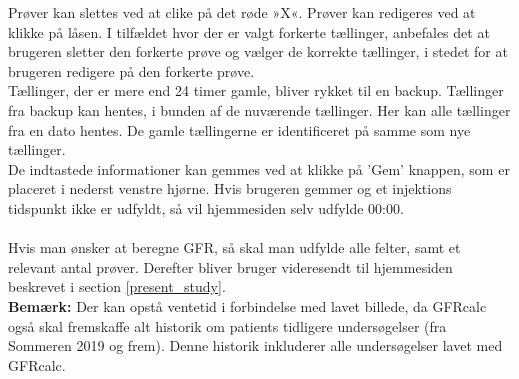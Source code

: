 \documentclass{article}
\begin{document}
Prøver kan slettes ved at clike på det røde »X«. Prøver kan redigeres ved at klikke på låsen. I tilfældet hvor der er valgt forkerte tællinger, anbefales det at brugeren sletter den forkerte prøve og vælger de korrekte tællinger, i stedet for at brugeren redigere på den forkerte prøve.\\

Tællinger, der er mere end 24 timer gamle, bliver rykket til en backup. Tællinger fra backup kan hentes, i bunden af de nuværende tællinger. Her kan alle tællinger fra en dato hentes. De gamle tællingerne er identificeret på samme som nye tællinger.
\\

De indtastede informationer kan gemmes ved at klikke på 'Gem' knappen, som er placeret i nederst venstre hjørne. Hvis brugeren gemmer og et injektions tidspunkt ikke er udfyldt, så vil hjemmesiden selv udfylde 00:00.\\\\
Hvis man ønsker at beregne GFR, så skal man udfylde alle felter, samt et relevant antal prøver. Derefter bliver bruger videresendt til hjemmesiden beskrevet i section \ref{present_study}.\\

\textbf{Bemærk:} Der kan opstå ventetid i forbindelse med lavet billede, da GFRcalc også skal fremskaffe alt historik om patients tidligere undersøgelser (fra Sommeren 2019 og frem). Denne historik inkluderer alle undersøgelser lavet med GFRcalc.  
\end{document}
